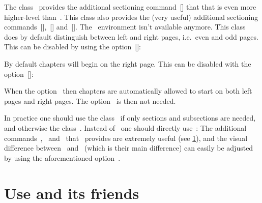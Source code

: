 The class~ provides the additional sectioning command~[\comname] that that is even more higher-level than~.
This class also provides the (very useful) additional sectioning commands~[\comname],~[\comname] and~[\comname].
The~ environment isn’t available anymore.
This class does by default distinguish between left and right pages, i.e.\ even and odd pages.
This can be disabled by using the option~[\optname]:
By default chapters will begin on the right page.
This can be disabled with the option~[\optname]:
When the option~ then chapters are automatically allowed to start on both left pages and right pages.
The option~ is then not needed.

In practice one should use the class~ if only sections and subsections are needed, and otherwise the class~.
Instead of~ one should directly use~:
The additional commands~,~ and~ that~ provides are extremely useful (see \cref{using frontmatter}), and the visual difference between~ and~ (which is their main difference) can easily be adjusted by using the aforementioned option~.




\section{Use  and its friends}
\label{using frontmatter}

